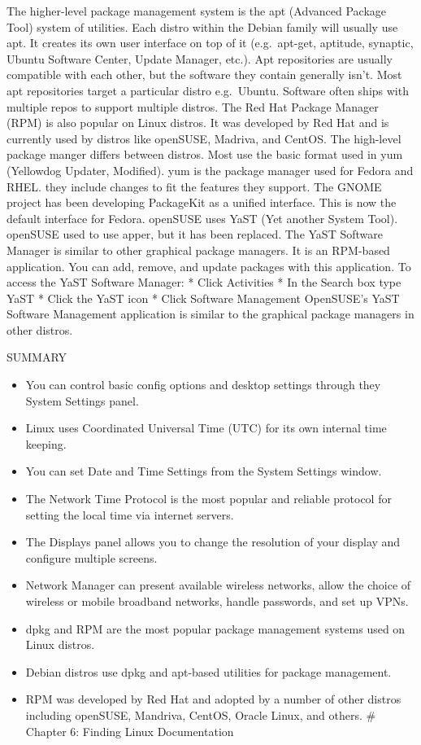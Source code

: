 The higher-level package management system is the apt (Advanced Package
Tool) system of utilities. Each distro within the Debian family will
usually use apt. It creates its own user interface on top of it
(e.g.~apt-get, aptitude, synaptic, Ubuntu Software Center, Update
Manager, etc.). Apt repositories are usually compatible with each other,
but the software they contain generally isn't. Most apt repositories
target a particular distro e.g.~Ubuntu. Software often ships with
multiple repos to support multiple distros. The Red Hat Package Manager
(RPM) is also popular on Linux distros. It was developed by Red Hat and
is currently used by distros like openSUSE, Madriva, and CentOS. The
high-level package manger differs between distros. Most use the basic
format used in yum (Yellowdog Updater, Modified). yum is the package
manager used for Fedora and RHEL. they include changes to fit the
features they support. The GNOME project has been developing PackageKit
as a unified interface. This is now the default interface for Fedora.
openSUSE uses YaST (Yet another System Tool). openSUSE used to use
apper, but it has been replaced. The YaST Software Manager is similar to
other graphical package managers. It is an RPM-based application. You
can add, remove, and update packages with this application. To access
the YaST Software Manager: * Click Activities * In the Search box type
YaST * Click the YaST icon * Click Software Management OpenSUSE's YaST
Software Management application is similar to the graphical package
managers in other distros.

SUMMARY

\begin{itemize}
\itemsep1pt\parskip0pt
\item
  You can control basic config options and desktop settings through they
  System Settings panel.
\item
  Linux uses Coordinated Universal Time (UTC) for its own internal time
  keeping.
\item
  You can set Date and Time Settings from the System Settings window.
\item
  The Network Time Protocol is the most popular and reliable protocol
  for setting the local time via internet servers.
\item
  The Displays panel allows you to change the resolution of your display
  and configure multiple screens.
\item
  Network Manager can present available wireless networks, allow the
  choice of wireless or mobile broadband networks, handle passwords, and
  set up VPNs.
\item
  dpkg and RPM are the most popular package management systems used on
  Linux distros.
\item
  Debian distros use dpkg and apt-based utilities for package
  management.
\item
  RPM was developed by Red Hat and adopted by a number of other distros
  including openSUSE, Mandriva, CentOS, Oracle Linux, and others. \#
  Chapter 6: Finding Linux Documentation
\end{itemize}

